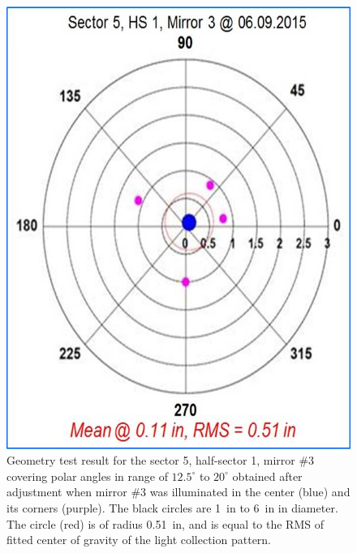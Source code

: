 \begin{figure}[ht]
    \centering
    \includegraphics[width=1.0\linewidth,trim={0 0cm 0 0},clip]{images/Ch_5_1_3_After_NEW.jpg}
    \caption{Geometry test result for the sector 5, half-sector 1, mirror \#3 covering polar angles in range of
      $12.5^\circ$ to $20^\circ$ obtained after adjustment when mirror \#3 was illuminated in the center (blue) and
      its corners (purple). The black circles are 1~in to 6~in in diameter. The circle (red) is of radius 0.51~in, and is
      equal to the RMS of fitted center of gravity  of the light collection pattern.}
    \label{fig:Ch_5_1_3_After_NEW}
\end{figure}

